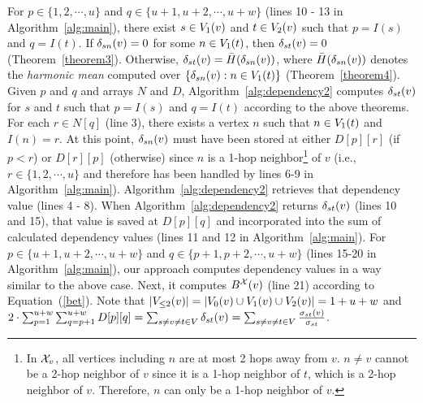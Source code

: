 


For $p \in \{1, 2, \cdots, u \}$ and $q \in \{ u+1, u+2, \cdots, u+w \}$ (lines 10 - 13 in Algorithm~\ref{alg:main}), there exist $s \in \V{v}{1}$ and $t \in \V{v}{2}$ such that $p = I(s)$ and $q = I(t)$.
If $\D{s}{n}{v} = 0$ for some $n \in \V{t}{1}$, then $\D{s}{t}{v} = 0$ (Theorem~\ref{theorem3}).
Otherwise, $\D{s}{t}{v} = \bar{H}(\D{s}{n}{v})$, where $\bar{H}(\D{s}{n}{v})$ denotes the {\em harmonic mean} computed over $\{\D{s}{n}{v} : n \in \V{t}{1}\}$ (Theorem~\ref{theorem4}).
Given $p$ and $q$ and arrays $N$ and $D$, Algorithm~\ref{alg:dependency2} computes $\D{s}{t}{v}$ for $s$ and $t$ such that $p = I(s)$ and $q = I(t)$ according to the above theorems.
For each $r \in N[q]$ (line 3), there exists a vertex $n$ such that $n \in \V{t}{1}$ and $I(n) = r$.
At this point, $\D{s}{n}{v}$ must have been stored at either $D[p][r]$ (if $p < r$) or $D[r][p]$ (otherwise) since $n$ is a 1-hop neighbor\footnote{In $\XN{v}$, all vertices including $n$ are at most 2 hops away from $v$. $n \ne v$ cannot be a 2-hop neighbor of $v$ since it is a 1-hop neighbor of $t$, which is a 2-hop neighbor of $v$. Therefore, $n$ can only be a 1-hop neighbor of $v$.} of $v$ (i.e., $r \in \{1, 2, \cdots, u \}$ and therefore has been handled by lines 6-9 in Algorithm~\ref{alg:main}).
Algorithm~\ref{alg:dependency2} retrieves that dependency value (lines 4 - 8).
When Algorithm~\ref{alg:dependency2} returns $\D{s}{t}{v}$ (lines 10 and 15), that value is saved at $D[p][q]$ and incorporated into the sum of calculated dependency values (lines 11 and 12 in Algorithm~\ref{alg:main}).
For $p \in \{u+1, u+2, \cdots, u+w \}$ and $q \in \{ p+1, p+2, \cdots, u+w \}$ (lines 15-20 in Algorithm~\ref{alg:main}), our approach computes dependency values in a way similar to the above case. 
Next, it computes $\BX{v}$ (line 21) according to Equation~(\ref{bet}).
Note that $|\LV{v}{2}| = |\V{v}{0} \cup \V{v}{1} \cup \V{v}{2}| = 1 + u + w$ and $2 \cdot \sum_{p=1}^{u+w} \sum_{q = p+1}^{u+w} D[p][q] = \sum_{s \neq v \neq t \in V}\D{s}{t}{v} = \sum_{s \neq v \neq t \in V}\frac{\sigma_{st}(v)}{\sigma_{st}}$.

